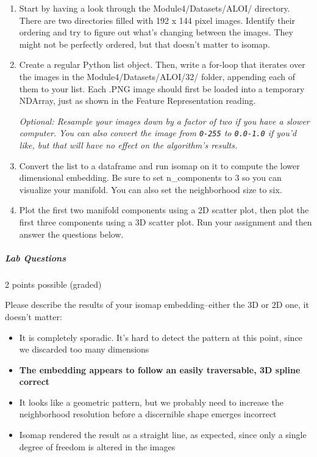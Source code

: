 \documentclass[11pt]{article}
\providecommand{\tightlist}{%
      \setlength{\itemsep}{0pt}\setlength{\parskip}{0pt}}
\begin{document}
\begin{enumerate}
\def\labelenumi{\arabic{enumi}.}
\item
  Start by having a look through the Module4/Datasets/ALOI/ directory.
  There are two directories filled with 192 x 144 pixel images. Identify
  their ordering and try to figure out what's changing between the
  images. They might not be perfectly ordered, but that doesn't matter
  to isomap.
\item
  Create a regular Python list object. Then, write a for-loop that
  iterates over the images in the Module4/Datasets/ALOI/32/ folder,
  appending each of them to your list. Each .PNG image should first be
  loaded into a temporary NDArray, just as shown in the Feature
  Representation reading.

  \emph{Optional: Resample your images down by a factor of two if you
  have a slower computer. You can also convert the image from
  \texttt{0-255} to \texttt{0.0-1.0} if you'd like, but that will have
  no effect on the algorithm's results.}
\item
  Convert the list to a dataframe and run isomap on it to compute the
  lower dimensional embedding. Be sure to set n\_components to 3 so you
  can visualize your manifold. You can also set the neighborhood size to
  six.
\item
  Plot the first two manifold components using a 2D scatter plot, then
  plot the first three components using a 3D scatter plot. Run your
  assignment and then answer the questions below.
\end{enumerate}

\hypertarget{lab-questions-1}{%
\subparagraph{Lab Questions}\label{lab-questions-1}}

2 points possible (graded)

Please describe the results of your isomap embedding--either the 3D or
2D one, it doesn't matter:

\begin{itemize}
\tightlist
\item
  It is completely sporadic. It's hard to detect the pattern at this
  point, since we discarded too many dimensions
\item
  \textbf{The embedding appears to follow an easily traversable, 3D
  spline correct}
\item
  It looks like a geometric pattern, but we probably need to increase
  the neighborhood resolution before a discernible shape emerges
  incorrect
\item
  Isomap rendered the result as a straight line, as expected, since only
  a single degree of freedom is altered in the images
\end{itemize}
\end{document}
